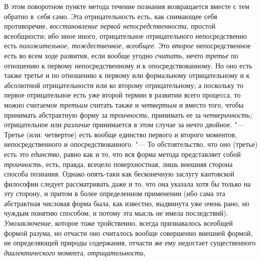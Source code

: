В этом поворотном пункте метода течение познания возвращается
вместе с тем обратно в~себя само. Эта отрицательность есть, как снимающее
себя противоречие, {\em восстановление
первой непосредственности}, простой всеобщности; ибо иное
иного, отрицательное отрицательного непосредственно есть
{\em положительное, тождественное, всеобщее}. Это {\em второе}
непосредственное есть во всем ходе развития, если вообще угодно {\em считать},
нечто {\em третье} по отношению к первому непосредственному и к
опосредствованному. Но оно есть также третье и по отношению к первому или
формальному отрицательному и к абсолютной отрицательности или ко второму
отрицательному; а поскольку то первое отрицательное есть уже второй термин
в развитии всего процесса, то можно считаемое {\em третьим} считать
также и {\em четвертым} и вместо того, чтобы принимать абстрактную форму за
{\em троичность}, принимать ее за {\em четверичность;} отрицательное или
{\em различие} принимается в этом случае за нечто двойное. "---
Третье (или: четвертое) есть вообще единство первого и
второго моментов, непосредственного и опосредствованного. "---
То обстоятельство, что оно (третье) есть это {\em единство}, равно как
и то, что вся форма метода представляет собой {\em троичность}, есть,
правда, всецело поверхностная, лишь внешняя сторона способа познания.
Однако опять-таки как бесконечную заслугу кантовской
философии
следует рассматривать даже и то, что она указала хотя бы
только на эту сторону, и притом в более определенном применении (ибо сама
эта абстрактная числовая форма была, как известно, выдвинута уже очень
рано, но чуждым понятию способом, и потому эта мысль не имела последствий).
{\em Умозаключение}, которое тоже тройственно, всегда признавалось всеобщей
формой разума, но отчасти оно считалось вообще совершенно внешней формой, не
определяющей природы содержания, отчасти же ему недостает существенного
{\em диалектического} момента, {\em отрицательности},
